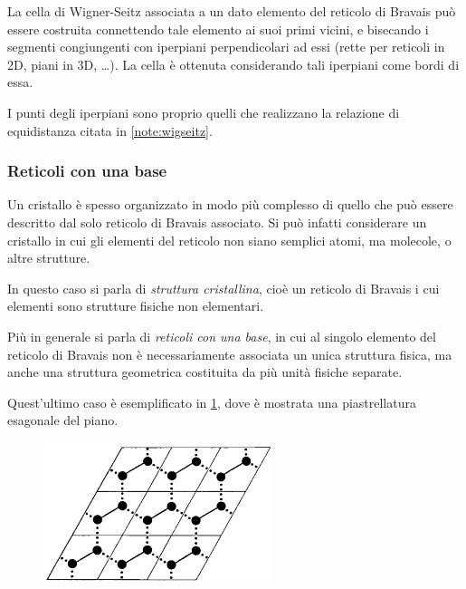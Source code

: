 \begin{oss}
	La cella di Wigner-Seitz associata a un dato elemento del reticolo di Bravais può essere costruita connettendo tale elemento ai suoi primi vicini, e bisecando i segmenti congiungenti con iperpiani perpendicolari ad essi (rette per reticoli in 2D, piani in 3D, \dots).
	La cella è ottenuta considerando tali iperpiani come bordi di essa.
	
	I punti degli iperpiani sono proprio quelli che realizzano la relazione di equidistanza citata in \cref{note:wigseitz}. 
\end{oss}

\subsubsection{Reticoli con una base} 

Un cristallo è spesso organizzato in modo più complesso di quello che può essere descritto dal solo reticolo di Bravais associato. 
Si può infatti considerare un cristallo in cui gli elementi del reticolo non siano semplici atomi, ma molecole, o altre strutture.

In questo caso si parla di \textit{struttura cristallina}, cioè un reticolo di Bravais i cui elementi sono strutture fisiche non elementari.

Più in generale si parla di \textit{reticoli con una base}, in cui al singolo elemento del reticolo di Bravais non è necessariamente associata un unica struttura fisica, ma anche una struttura geometrica costituita da più unità fisiche separate.

Quest'ultimo caso è esemplificato in \cref{fig:honey}, dove è mostrata una piastrellatura esagonale del piano.

\begin{figure}[h]
	\centering
	\includegraphics[width=0.6\textwidth]{Immagini/HoneycombLattice.png}
	\vspace{-5pt}
	\caption{}
	\label{fig:honey}
	\vspace{-5pt}
\end{figure}


